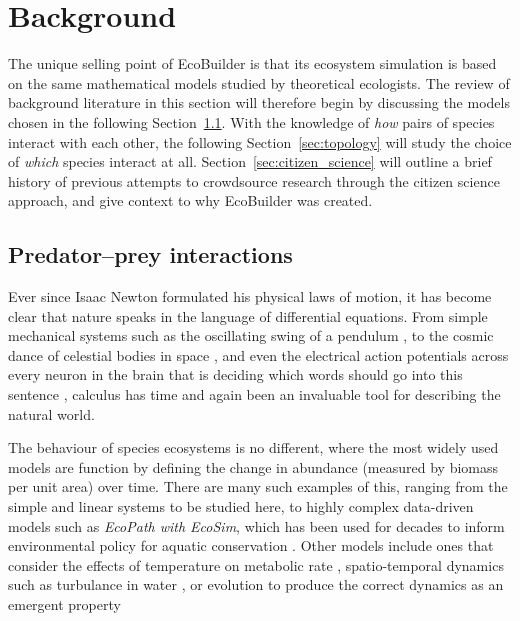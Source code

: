 \section{Background}
\label{sec:joy_background}
The unique selling point of EcoBuilder is that its ecosystem simulation is based on the same mathematical models studied by theoretical ecologists. The review of background literature in this section will therefore begin by discussing the models chosen in the following Section~\ref{sec:predator_prey}. With the knowledge of \emph{how} pairs of species interact with each other, the following Section~\ref{sec:topology} will study the choice of \emph{which} species interact at all. Section~\ref{sec:citizen_science} will outline a brief history of previous attempts to crowdsource research through the citizen science approach, and give context to why EcoBuilder was created.

\subsection{Predator--prey interactions}
\label{sec:predator_prey}
Ever since Isaac Newton formulated his physical laws of motion, it has become clear that nature speaks in the language of differential equations. From simple mechanical systems such as the oscillating swing of a pendulum \cite{Fulcher1976}, to the cosmic dance of celestial bodies in space \cite{Marchal2012}, and even the electrical action potentials across every neuron in the brain that is deciding which words should go into this sentence \cite{Hodgkin1952}, calculus has time and again been an invaluable tool for describing the natural world. 

The behaviour of species ecosystems is no different, where the most widely used models are function by defining the change in abundance (measured by biomass per unit area) over time.
There are many such examples of this, ranging from the simple and linear systems to be studied here, to highly complex data-driven models such as \emph{EcoPath with EcoSim}, which has been used for decades to inform environmental policy for aquatic conservation \cite{Christensen2004}.
Other models include ones that consider the effects of temperature on metabolic rate \cite{Savage2004, Dell2014}, spatio-temporal dynamics such as turbulance in water \cite{Watteaux2015}, or evolution to produce the correct dynamics as an emergent property \cite{Laird2008}

